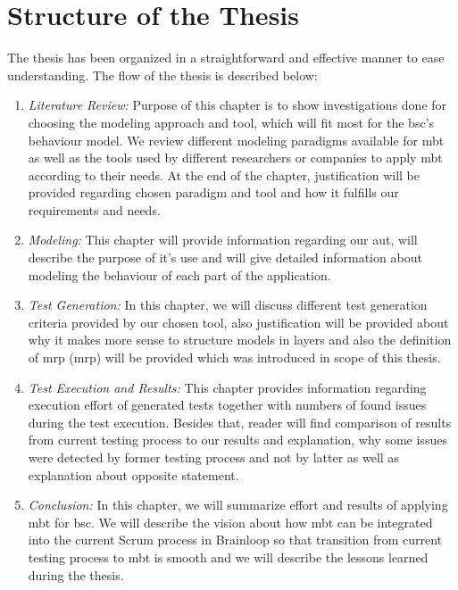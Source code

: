 \section{Structure of the Thesis}
The thesis has been organized in a straightforward and effective manner to ease understanding. The flow of the thesis is described below:

\begin{enumerate}

\item \textit{Literature Review: }
Purpose of this chapter is to show investigations done for choosing the modeling approach and tool, which will fit most for the \acrshort{bsc}’s behaviour model. We review different modeling paradigms available for \acrshort{mbt} as well as the tools used by different researchers or companies to apply \acrshort{mbt} according to their needs. At the end of the chapter, justification will be provided regarding chosen paradigm and tool and how it fulfills our requirements and needs.

\item \textit{Modeling: } This chapter will provide information regarding our \acrlong{aut}, will describe the purpose of it's use and will give detailed information about modeling the behaviour of each part of the application.

\item \textit{Test Generation: } In this chapter, we will discuss different test generation criteria provided by our chosen tool, also justification will be provided about why it makes more sense to structure models in layers and also the definition of \acrshort{mrp} (\acrlong{mrp}) will be provided which was introduced in scope of this thesis.

\item \textit{Test Execution and Results: } This chapter provides information regarding execution effort of generated tests together with numbers of found issues during the test execution. Besides that, reader will find comparison of results from current testing process to our results and explanation, why some issues were detected by former testing process and not by latter as well as explanation about opposite statement.

\item \textit{Conclusion:  }In this chapter, we will summarize effort and results of applying \acrshort{mbt} for \acrshort{bsc}. We will describe the vision about how \acrshort{mbt} can be integrated into the current Scrum process in Brainloop so that transition from current testing process to \acrshort{mbt} is smooth and we will describe the lessons learned during the thesis.


\end{enumerate}
